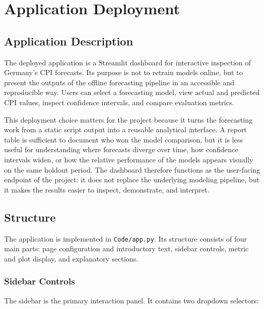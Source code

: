 %
%
%

\chapter{Application Deployment}
\label{ch:app-deployment}

\section{Application Description}

The deployed application is a Streamlit dashboard for interactive inspection of Germany's CPI forecasts. Its purpose is not to retrain models online, but to present the outputs of the offline forecasting pipeline in an accessible and reproducible way. Users can select a forecasting model, view actual and predicted CPI values, inspect confidence intervals, and compare evaluation metrics.

This deployment choice matters for the project because it turns the forecasting work from a static script output into a reusable analytical interface. A report table is sufficient to document who won the model comparison, but it is less useful for understanding where forecasts diverge over time, how confidence intervals widen, or how the relative performance of the models appears visually on the same holdout period. The dashboard therefore functions as the user-facing endpoint of the project: it does not replace the underlying modeling pipeline, but it makes the results easier to inspect, demonstrate, and interpret.

\section{Structure}

The application is implemented in \texttt{Code/app.py}. Its structure consists of four main parts: page configuration and introductory text, sidebar controls, metric and plot display, and explanatory sections.

\subsection{Sidebar Controls}

The sidebar is the primary interaction panel. It contains two dropdown selectors:

